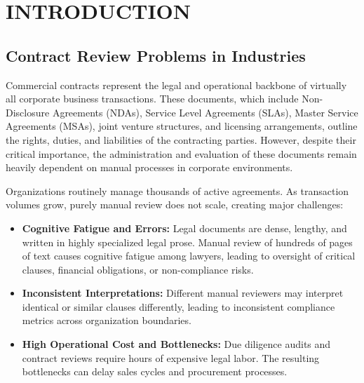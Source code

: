 \documentclass[12pt, a4paper]{report}
\begin{document}
\chapter{INTRODUCTION}
\label{ch:introduction}

\section{Contract Review Problems in Industries}
Commercial contracts represent the legal and operational backbone of virtually all corporate business transactions. These documents, which include Non-Disclosure Agreements (NDAs), Service Level Agreements (SLAs), Master Service Agreements (MSAs), joint venture structures, and licensing arrangements, outline the rights, duties, and liabilities of the contracting parties. However, despite their critical importance, the administration and evaluation of these documents remain heavily dependent on manual processes in corporate environments. 

Organizations routinely manage thousands of active agreements. As transaction volumes grow, purely manual review does not scale, creating major challenges:
\begin{itemize}
    \item \textbf{Cognitive Fatigue and Errors:} Legal documents are dense, lengthy, and written in highly specialized legal prose. Manual review of hundreds of pages of text causes cognitive fatigue among lawyers, leading to oversight of critical clauses, financial obligations, or non-compliance risks.
    \item \textbf{Inconsistent Interpretations:} Different manual reviewers may interpret identical or similar clauses differently, leading to inconsistent compliance metrics across organization boundaries.
    \item \textbf{High Operational Cost and Bottlenecks:} Due diligence audits and contract reviews require hours of expensive legal labor. The resulting bottlenecks can delay sales cycles and procurement processes.
\end{itemize}
\end{document}
